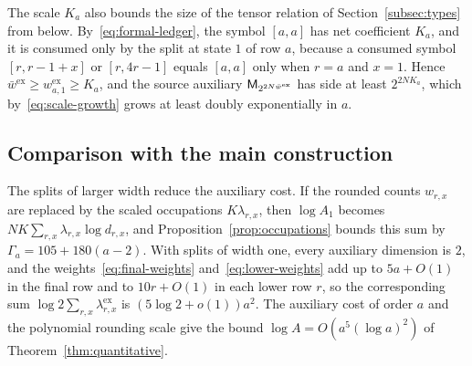 The scale \(K_a\) also bounds the size of the tensor relation of
Section~\ref{subsec:types} from below. By~\eqref{eq:formal-ledger}, the
symbol \([a,a]\) has net coefficient \(K_a\), and it is consumed only by
the split at state \(1\) of row \(a\), because a consumed symbol
\([r,r-1+x]\) or \([r,4r-1]\) equals \([a,a]\) only when \(r=a\) and
\(x=1\). Hence \(\bar w^{\mathrm{ex}}\ge w^{\mathrm{ex}}_{a,1}\ge K_a\),
and the source auxiliary \(\mathsf M_{2^{2N\bar w^{\mathrm{ex}}}}\) has side at
least \(2^{2NK_a}\), which by~\eqref{eq:scale-growth} grows at least
doubly exponentially in \(a\).

\subsection{Comparison with the main construction}
\label{subsec:exact-normalization}

The splits of larger width reduce the auxiliary cost. If the rounded
counts \(w_{r,x}\) are replaced by the scaled occupations
\(K\lambda_{r,x}\), then \(\log A_1\) becomes
\(NK\sum_{r,x}\lambda_{r,x}\log d_{r,x}\), and
Proposition~\ref{prop:occupations} bounds this sum by
\(\Gamma_a=105+180(a-2)\). With splits of width one, every auxiliary
dimension is \(2\), and the weights~\eqref{eq:final-weights}
and~\eqref{eq:lower-weights} add up to \(5a+O(1)\) in the final row and
to \(10r+O(1)\) in each lower row \(r\), so the corresponding sum
\(\log2\sum_{r,x}\lambda^{\mathrm{ex}}_{r,x}\) is \((5\log2+o(1))a^2\).
The auxiliary cost of order \(a\) and the polynomial rounding scale give
the bound \(\log A=O(a^5(\log a)^2)\) of Theorem~\ref{thm:quantitative}.

